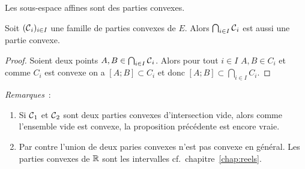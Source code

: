 \begin{cor}
  Les sous-espace affines sont des parties convexes.
\end{cor}
%
\begin{prop}
  Soit \((\mathcal{C}{}_i)_{i \in I}\) une famille de parties convexes de \(E\). Alors \(\bigcap_{i \in I} \mathcal{C}{}_i\) est aussi une partie convexe.
\end{prop}
\begin{proof}
  Soient deux points \(A,B \in \bigcap_{i\in I} \mathcal{C}{}_i\). Alors pour tout \(i \in I\) \(A,B \in C_i\) et comme \(C_i\) est convexe on a \([A;B] \subset C_i\) et donc \([A;B] \subset \bigcap_{i \in I} C_i\).
\end{proof}
%
\emph{Remarques}~:
\begin{enumerate}
\item Si \(\mathcal{C}{}_1\) et \(\mathcal{C}{}_2\)  sont deux parties convexes d'intersection vide, alors comme l'ensemble vide est convexe, la proposition précédente est encore vraie.
\item Par contre l'union de deux paries convexes n'est pas convexe en général. Les parties convexes de \(\mathbb{R}\) sont les intervalles cf.\ chapitre~\ref{chap:reels}.
\end{enumerate}
